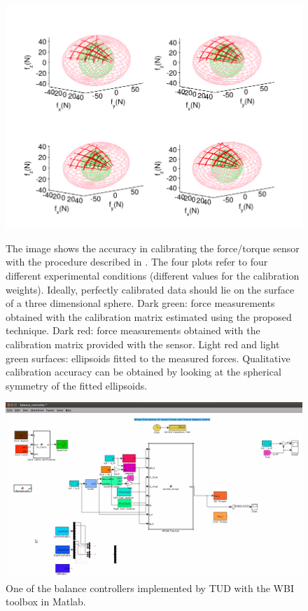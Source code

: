 \begin{figure}[h]
\vspace{0.5em}
\centering
{\includegraphics[width=\linewidth]{images/leg_validation.pdf}}
\caption{The image shows the accuracy in calibrating the force/torque sensor
  with the procedure described in \cite{Traversaro2015b}. The four plots refer
  to four different experimental conditions (different values for the
  calibration weights).  Ideally, perfectly calibrated data should lie on the
  surface of a three dimensional sphere. Dark green: force measurements
  obtained with the calibration matrix estimated using the proposed
  technique. Dark red: force measurements obtained with the calibration matrix
  provided with the sensor.  Light red and light green surfaces: ellipsoids
  fitted to the measured forces.  Qualitative calibration accuracy can be
  obtained by looking at the spherical symmetry of the fitted ellipsoids.}
\label{fig:validation}
\end{figure}

 \begin{figure}
 \centering
 \includegraphics[width=\linewidth]{images/wbi_torque_controller.png}
  \caption{One of the balance controllers implemented by TUD with the WBI
    toolbox in Matlab.  }
 \label{fig:wbitud}
 \end{figure}


